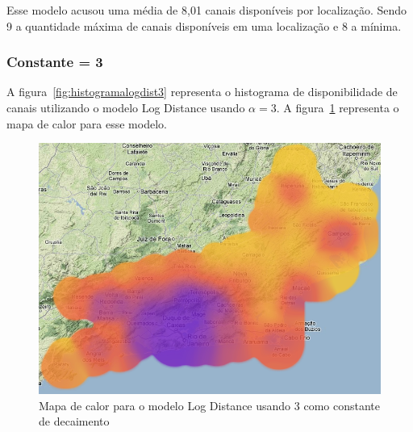 \FloatBarrier

Esse modelo acusou uma média de 8,01 canais disponíveis por localização. Sendo 9 a quantidade máxima de canais disponíveis em uma localização e 8 a mínima.

\subsubsection{Constante = 3}

A figura~\ref{fig:histogramalogdist3} representa o histograma de disponibilidade de canais utilizando o modelo Log Distance usando \begin{math}\alpha=3 \end{math}. A figura~\ref{fig:LogDist3heatmap} representa o mapa de calor para esse modelo.

\begin{figure}[htb]
\centering
\includegraphics[width=1.0\textwidth]{figs/logdist3heatmap}
\caption[Mapa de calor para o modelo Log Distance usando 3 como constante de decaimento]
{Mapa de calor para o modelo Log Distance usando 3 como constante de decaimento }
\label{fig:LogDist3heatmap}
\end{figure} 

